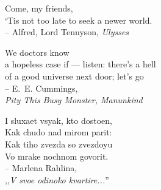 Come, my friends,\\
`Tis not too late to seek a newer world.\\
-- Alfred, Lord Tennyson, \emph{Ulysses}

\bigskip
\bigskip
\bigskip

We doctors know\\
a hopeless case if --- listen: there's a hell\\
of a good universe next door; let's go\\
-- E.~E. Cummings,\\ \emph{Pity This Busy Monster, Manunkind}

\bigskip
\bigskip
\bigskip

{\cyr 
I sluxaet vsyak, kto dostoen,\\
Kak chudo nad mirom parit:\\
Kak tiho zvezda so zvezdoyu\\
Vo mrake nochnom govorit.}\\
-- {\cyr Marlena Rahlina, \\}
,,{\cyr\emph{V svoe\cyrishrt{} odinoko\cyrishrt{} kvartire...}''
}
